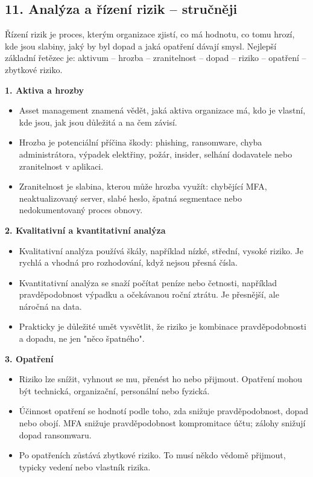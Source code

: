 
\subsection*{11. Analýza a řízení rizik -- stručněji}
Řízení rizik je proces, kterým organizace zjistí, co má hodnotu, co tomu hrozí, kde jsou slabiny, jaký by byl dopad a jaká opatření dávají smysl. Nejlepší základní řetězec je: aktivum -- hrozba -- zranitelnost -- dopad -- riziko -- opatření -- zbytkové riziko.

\textbf{1. Aktiva a hrozby}
\begin{itemize}
  \item Asset management znamená vědět, jaká aktiva organizace má, kdo je vlastní, kde jsou, jak jsou důležitá a na čem závisí.
  \item Hrozba je potenciální příčina škody: phishing, ransomware, chyba administrátora, výpadek elektřiny, požár, insider, selhání dodavatele nebo zranitelnost v aplikaci.
  \item Zranitelnost je slabina, kterou může hrozba využít: chybějící MFA, neaktualizovaný server, slabé heslo, špatná segmentace nebo nedokumentovaný proces obnovy.
\end{itemize}

\textbf{2. Kvalitativní a kvantitativní analýza}
\begin{itemize}
  \item Kvalitativní analýza používá škály, například nízké, střední, vysoké riziko. Je rychlá a vhodná pro rozhodování, když nejsou přesná čísla.
  \item Kvantitativní analýza se snaží počítat peníze nebo četnosti, například pravděpodobnost výpadku a očekávanou roční ztrátu. Je přesnější, ale náročná na data.
  \item Prakticky je důležité umět vysvětlit, že riziko je kombinace pravděpodobnosti a dopadu, ne jen "něco špatného".
\end{itemize}

\textbf{3. Opatření}
\begin{itemize}
  \item Riziko lze snížit, vyhnout se mu, přenést ho nebo přijmout. Opatření mohou být technická, organizační, personální nebo fyzická.
  \item Účinnost opatření se hodnotí podle toho, zda snižuje pravděpodobnost, dopad nebo obojí. MFA snižuje pravděpodobnost kompromitace účtu; zálohy snižují dopad ransomwaru.
  \item Po opatřeních zůstává zbytkové riziko. To musí někdo vědomě přijmout, typicky vedení nebo vlastník rizika.
\end{itemize}

